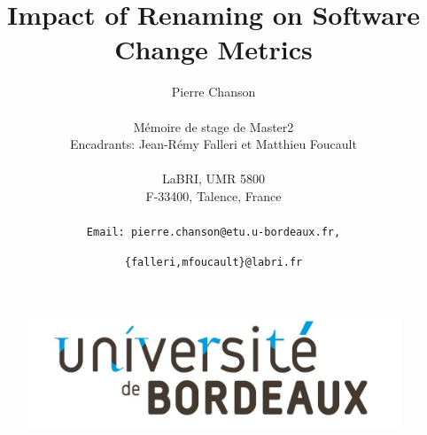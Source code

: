 \documentclass[11pt,a4paper]{article}
\title{\vspace{4cm}\textbf{Impact of Renaming on Software Change Metrics}\vspace{3cm}}
\author{
Pierre Chanson\\\\
Mémoire de stage de Master2\\
Encadrants: Jean-Rémy Falleri et Matthieu Foucault\\\\
LaBRI, UMR 5800\\
F-33400, Talence, France\\\\
\texttt{Email: pierre.chanson@etu.u-bordeaux.fr,}\and
\texttt{\{falleri,mfoucault\}@labri.fr}\\
}
\begin{document}
\begin{figure}[t]
\center
\includegraphics[scale=0.25]{data/figures/UnivBordeaux.jpg}
\end{figure}
\maketitle
\newpage
\tableofcontents
\newpage












\end{document}
